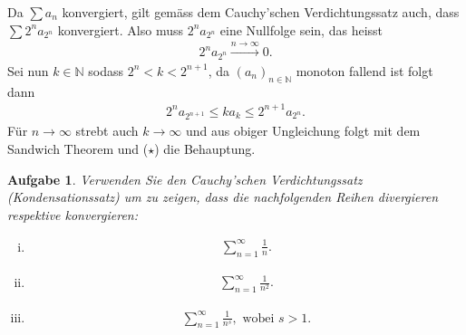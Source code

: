 \documentclass[a4paper, 20]{exam}
\newtheorem{ex}{Aufgabe}
\begin{document}
\begin{solution} Da $\sum a_n$ konvergiert, gilt gemäss dem Cauchy'schen Verdichtungssatz auch, dass $\sum 2^n a_{2^n}$ konvergiert. Also muss $2^na_{2^n}$ eine Nullfolge sein, das heisst 
\begin{align*}
2^n a_{2^n} \xrightarrow{n \to \infty} 0. \tag{$\star$}
\end{align*}
Sei nun $k \in \mathbb{N}$ sodass $2^n < k <2^{n+1}$, da $(a_n)_{n \in \mathbb{N}}$ monoton fallend ist folgt dann
\begin{align*}
2^n a_{2^{n+1}} \leq k a_k \leq 2^{n+1} a_{2^n}.
\end{align*}
Für $n \to \infty$ strebt auch $k \to \infty$ und aus obiger Ungleichung folgt mit dem Sandwich Theorem und ($\star$) die Behauptung. 
\end{solution}

\begin{ex} Verwenden Sie den Cauchy'schen Verdichtungssatz (Kondensationssatz) um zu zeigen, dass die nachfolgenden Reihen divergieren respektive konvergieren:
\begin{enumerate}[i)]
\item \begin{align*}
\sum_{n=1}^\infty \frac{1}{n}.
\end{align*}
\item \begin{align*}
\sum_{n=1}^\infty \frac{1}{n^2}.
\end{align*}

\item 
\begin{align*}
 \sum_{n=1}^\infty \frac{1}{n^s}, \text{ wobei } s >1. 
\end{align*}

\end{enumerate}

\end{ex}
\end{document}
